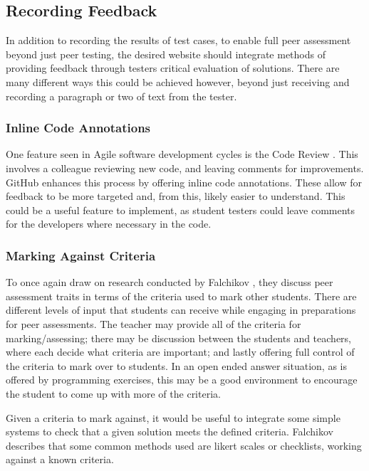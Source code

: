 \documentclass[a4paper,11pt]{report}
\begin{document}
\subsection{Recording Feedback}
In addition to recording the results of test cases, to enable full peer assessment beyond just peer testing, the desired website should integrate methods of providing feedback through testers critical evaluation of solutions. There are many different ways this could be achieved however, beyond just receiving and recording a paragraph or two of text from the tester.
\subsubsection*{Inline Code Annotations}
One feature seen in Agile software development cycles is the Code Review \cite{github_project_2016}. This involves a colleague reviewing new code, and leaving comments for improvements. GitHub enhances this process by offering inline code annotations. These allow for feedback to be more targeted and, from this, likely easier to understand. This could be a useful feature to implement, as student testers could leave comments for the developers where necessary in the code.
\subsubsection*{Marking Against Criteria} 
To once again draw on research conducted by Falchikov \cite{falchikov_improving_2013}, they discuss peer assessment traits in terms of the criteria used to mark other students. There are different levels of input that students can receive while engaging in preparations for peer assessments. The teacher may provide all of the criteria for marking/assessing; there may be discussion between the students and teachers, where each decide what criteria are important; and lastly offering full control of the criteria to mark over to students. In an open ended answer situation, as is offered by programming exercises, this may be a good environment to encourage the student to come up with more of the criteria.\par
Given a criteria to mark against, it would be useful to integrate some simple systems to check that a given solution meets the defined criteria. Falchikov describes that some common methods used are likert scales or checklists, working against a known criteria.
\end{document}
